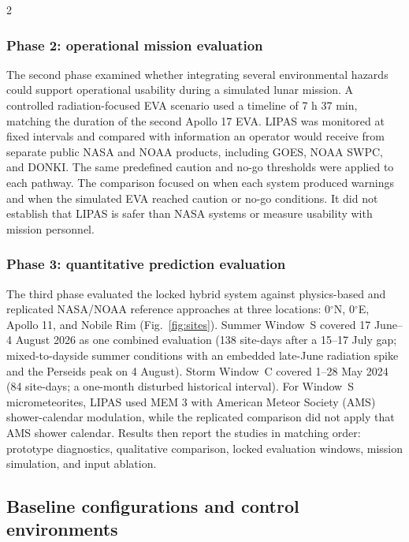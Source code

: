 \begin{multicols}{2}
\subsubsection{Phase 2: operational mission evaluation}

The second phase examined whether integrating several environmental hazards could support operational usability during a simulated lunar mission. A controlled radiation-focused EVA scenario used a timeline of 7 h 37 min, matching the duration of the second Apollo 17 EVA. LIPAS was monitored at fixed intervals and compared with information an operator would receive from separate public NASA and NOAA products, including GOES, NOAA SWPC, and DONKI. The same predefined caution and no-go thresholds were applied to each pathway. The comparison focused on when each system produced warnings and when the simulated EVA reached caution or no-go conditions. It did not establish that LIPAS is safer than NASA systems or measure usability with mission personnel.

\subsubsection{Phase 3: quantitative prediction evaluation}

The third phase evaluated the locked hybrid system against physics-based and replicated NASA/NOAA reference approaches at three locations: 0$^\circ$N, 0$^\circ$E, Apollo 11, and Nobile Rim (Fig.~\ref{fig:sites}). Summer Window~S covered 17 June--4 August 2026 as one combined evaluation (138 site-days after a 15--17 July gap; mixed-to-dayside summer conditions with an embedded late-June radiation spike and the Perseids peak on 4 August). Storm Window~C covered 1--28 May 2024 (84 site-days; a one-month disturbed historical interval). For Window~S micrometeorites, LIPAS used MEM 3 with American Meteor Society (AMS) shower-calendar modulation, while the replicated comparison did not apply that AMS shower calendar. Results then report the studies in matching order: prototype diagnostics, qualitative comparison, locked evaluation windows, mission simulation, and input ablation.

\subsection{Baseline configurations and control environments}


\end{multicols}
